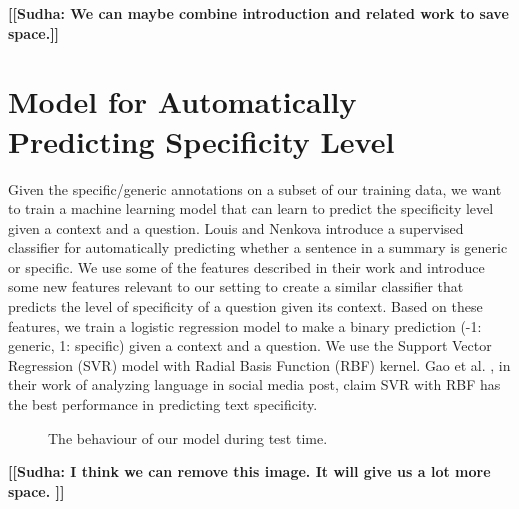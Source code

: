\documentclass[11pt]{article}
\newcommand{\sudha}[1]{\textbf{\textsf{\textcolor{blue!80!white}{\footnotesize [[Sudha: #1]]}}}}
\begin{document}
\sudha{We can maybe combine introduction and related work to save space.}

\section{Model for Automatically Predicting Specificity Level}\label{classifier}

Given the specific/generic annotations on a subset of our training data, we want to train a machine learning model that can learn to predict the specificity level given a context and a question. Louis and Nenkova  \cite{louis2011automatic} introduce a supervised classifier for automatically predicting whether a sentence in a summary is generic or specific. We use some of the features described in their work and introduce some new features relevant to our setting to create a similar classifier that predicts the level of specificity of a question given its context. Based on these features, we train a logistic regression model to make a binary prediction (-1: generic, 1: specific) given a context and a question. We use the Support Vector Regression (SVR) model with Radial Basis Function (RBF) kernel. Gao et al. \cite{Gao2019PredictingAA}, in their work of analyzing language in social media post, claim SVR with RBF has the best performance in predicting text specificity.\\

\begin{figure}[h]
\centering
    \caption{The behaviour of our model during test time.}\label{roadmap}
\end{figure}
\sudha{I think we can remove this image. It will give us a lot more space. }
\end{document}

